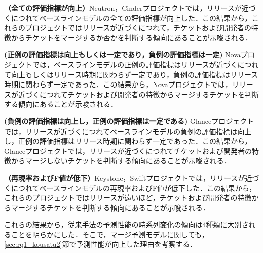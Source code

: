 \documentclass[11pt]{jreport}
\begin{document}
\textbf{（全ての評価指標が向上）}Neutron，Cinderプロジェクトでは，リリースが近づくにつれてベースラインモデルの全ての評価指標が向上した．この結果から，これらのプロジェクトではリリースが近づくにつれて，チケットおよび開発者の特徴からチケットをマージするか否かを判断する傾向にあることが示唆される．

\textbf{ (正例の評価指標は向上もしくは一定であり，負例の評価指標は一定) }Novaプロジェクトでは，ベースラインモデルの正例の評価指標はリリースが近づくにつれて向上もしくはリリース時期に関わらず一定であり，負例の評価指標はリリース時期に関わらず一定であった．この結果から，Novaプロジェクトでは，リリースが近づくにつれてチケットおよび開発者の特徴からマージするチケットを判断する傾向にあることが示唆される．

\textbf{ (負例の評価指標は向上し，正例の評価指標は一定である) }Glanceプロジェクトでは，リリースが近づくにつれてベースラインモデルの負例の評価指標は向上し，正例の評価指標はリリース時期に関わらず一定であった．この結果から，Glanceプロジェクトでは，リリースが近づくにつれてチケットおよび開発者の特徴からマージしないチケットを判断する傾向にあることが示唆される．

\textbf{（再現率およびF値が低下）}Keystone，Swiftプロジェクトでは，リリースが近づくにつれてベースラインモデルの再現率およびF値が低下した．この結果から，これらのプロジェクトではリリースが遠いほど，チケットおよび開発者の特徴からマージするチケットを判断する傾向にあることが示唆される．

これらの結果から，従来手法の予測性能の時系列変化の傾向は4種類に大別されることを明らかにした．そこで，マージ予測モデルに関しても，\ref{sec:rq1_kousatu2}節で予測性能が向上した理由を考察する．

\begin{table}[t]
\caption{各プロジェクトのマージ予測モデルにおける評価指標の回帰係数の分類}
\label{table:merge_seino_jikeiretsu}
\centering
\vspace{0.5zh}
\end{table}
\end{document}
